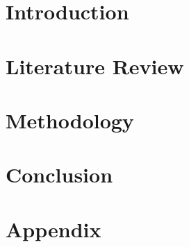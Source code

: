 \documentclass[a4paper,10pt, twoside]{article}
\begin{document}
    \tableofcontents
    \cleardoublepage


    \pagestyle{fancy}      %
    
    \section{Introduction}\label{sec:introduction}
        
    \cleardoublepage
    
    
    \section{Literature Review}\label{sec:lit_review}
        
    \cleardoublepage


    \section{Methodology}\label{sec:methodology}
        
    \cleardoublepage

    \section{Conclusion}\label{sec:conclusion}
        
    \cleardoublepage


    
    
    \cleardoublepage


    \section*{Appendix}\label{sec:appendix}
        
    \cleardoublepage
\end{document}
